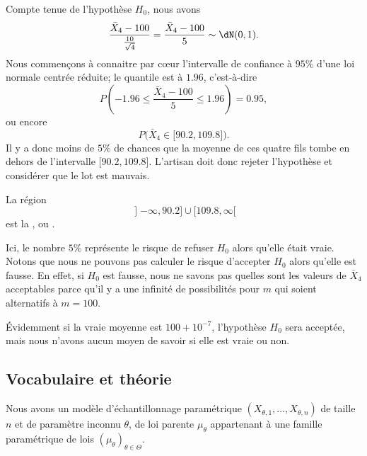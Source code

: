 Compte tenue de l'hypothèse \( H_0\), nous avons
\begin{equation}
	\frac{ \bar X_4-100 }{ \frac{ 10 }{ \sqrt{4} } }=\frac{ \bar X_4-100 }{ 5 }\sim\dN(0,1).
\end{equation}
Nous commençons à connaitre par cœur l'intervalle de confiance à \( 95\%\) d'une loi normale centrée réduite; le quantile est à \( 1.96\), c'est-à-dire
\begin{equation}
	P\left( -1.96\leq\frac{ \bar X_4-100 }{ 5 }\leq 1.96 \right)=0.95,
\end{equation}
ou encore
\begin{equation}
	P\big( \bar X_4\in\mathopen[ 90.2 , 109.8 \mathclose] \big).
\end{equation}
Il y a donc moins de \( 5\%\) de chances que la moyenne de ces quatre fils tombe en dehors de l'intervalle \( \mathopen[ 90.2 , 109.8 \mathclose]\). L'artisan doit donc rejeter l'hypothèse et considérer que le lot est mauvais.

La région
\begin{equation}
	\mathopen] -\infty , 90.2 \mathclose]\cup\mathopen[ 109.8 , \infty [
\end{equation}
est la , ou .

Ici, le nombre \( 5\%\) représente le risque de refuser \( H_0\) alors qu'elle était vraie. Notons que nous ne pouvons pas calculer le risque d'accepter \( H_0\) alors qu'elle est fausse. En effet, si \( H_0\) est fausse, nous ne savons pas quelles sont les valeurs de \( \bar X_4\) acceptables parce qu'il y a une infinité de possibilités pour \( m\) qui soient alternatifs à \( m=100\).

Évidemment si la vraie moyenne est \( 100+10^{-7}\), l'hypothèse \( H_0\) sera acceptée, mais nous n'avons aucun moyen de savoir si elle est vraie ou non.

\subsection{Vocabulaire et théorie}

Nous avons un modèle d'échantillonnage paramétrique \(  (X_{\theta,1},\ldots,X_{\theta,n})  \) de taille \( n\) et de paramètre inconnu \( \theta\), de loi parente \( \mu_{\theta}\) appartenant à une famille paramétrique de lois \( (\mu_{\theta})_{\theta\in\Theta}\).

